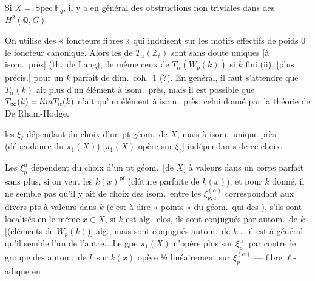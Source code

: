 \documentclass[11pt,a4paper]{article}
\begin{document}
 Si $X = \operatorname{Spec} \mathbb{F}_q$, il y a en
général des \struck{\ill{}} obstructions non triviales dans des
$H^2(\mathbb{Q}, G)$ ---

On utilise des « foncteurs fibres » qui induisent sur les motifs effectifs
de poids $0$ le foncteur canonique. Alors les  de
$T_\alpha(\mathbb{Z}_\ell)$ sont sans doute uniques [à isom.\ près] (th.\ de
Lang), de même ceux de $T_\alpha(W_p(k))$ si $k$ fini (ii), [plus précis.]
pour un $k$ parfait de dim.\ coh.\ $1$ (?). En général, il faut s'attendre
que $T_\alpha(k)$ \struck{\ill{}} ait plus d'un élément à isom.\ près, mais
il est possible que $T_\infty(k) = \varprojlim T_\alpha(k)$ n'ait qu'un
élément à isom.\ près, celui donné par la théorie de De Rham-Hodge.


les $\xi_\ell$ \ill{} dépendant du choix d'un pt géom.\ de $X$, mais à
isom.\ unique près (dépendance du $\pi_1(X)$) [$\pi_1(X)$ opère sur
$\xi_\ell$]  indépendants de ce choix.

Les $\xi_p^{\alpha}$ dépendent du choix d'un  pt géom.\ [de
$X$] à valeurs dans un corps parfait sans plus, si on veut les
$k(x)^{\mathrm{pf}}$ (clôture parfaite de $k(x)$), et pour $k$ donné, il ne
semble pas qu'il y ait de choix des isom.\ entre les $\xi_{p,a}^{(\alpha)}$
correspondant aux divers pts à valeurs dans $k$ (c'est-à-dire « points
\ill{} » du \ill{} géom.\ qui \ill{} des ), s'ils sont
localisés en le même $x \in X$, \struck{\ill{}} \struck{\ill{}} si $k$ est
alg.\ clos, ils sont conjugués par autom.\ de $k$ [(éléments de
$W_p(k)$)] \ill{} alg., mais sont \ill{} conjugués \ill{} autom.\ de $k$
… il est à \ill{} général qu'il semble \ill{} l'un \ill{} de
l'autre… Le gpe $\pi_1(X)$ n'opère plus sur $\xi_p^{\alpha}$,
par contre le groupe des autom.\ de $k$ sur $k(x)$
\struck{\ill{}} opère ½ linéairement sur $\xi_p^{(\alpha)}$ ---
\ill{} fibre $\ell$-adique en \ill{}
\end{document}
